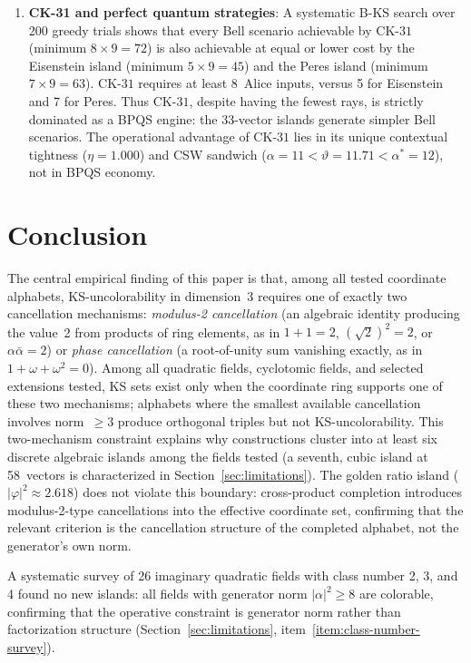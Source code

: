 \documentclass[12pt,a4paper]{article}
\newcommand{\CK}{\mathrm{CK}\text{-}31}
\begin{document}
\begin{enumerate}
    \item \textbf{CK-31 and perfect quantum strategies}: A systematic B-KS search over 200 greedy trials shows that every Bell scenario achievable by $\CK$ (minimum $8 \times 9 = 72$) is also achievable at equal or lower cost by the Eisenstein island (minimum $5 \times 9 = 45$) and the Peres island (minimum $7 \times 9 = 63$).  $\CK$ requires at least 8~Alice inputs, versus 5 for Eisenstein and 7 for Peres.  Thus $\CK$, despite having the fewest rays, is strictly dominated as a BPQS engine: the 33-vector islands generate simpler Bell scenarios. The operational advantage of $\CK$ lies in its unique contextual tightness ($\eta = 1.000$) and CSW sandwich ($\alpha = 11 < \vartheta = 11.71 < \alpha^* = 12$), not in BPQS economy.
\end{enumerate}

\section{Conclusion}\label{sec:conclusion}

The central empirical finding of this paper is that, among all tested coordinate alphabets, KS-uncolorability in dimension~3 requires one of exactly two cancellation mechanisms: \emph{modulus-2 cancellation} (an algebraic identity producing the value~2 from products of ring elements, as in $1+1=2$, $(\sqrt{2})^2=2$, or $\alpha\bar\alpha=2$) or \emph{phase cancellation} (a root-of-unity sum vanishing exactly, as in $1+\omega+\omega^2=0$).  Among all quadratic fields, cyclotomic fields, and selected extensions tested, KS sets exist only when the coordinate ring supports one of these two mechanisms; alphabets where the smallest available cancellation involves norm~$\geq 3$ produce orthogonal triples but not KS-uncolorability.  This two-mechanism constraint explains why constructions cluster into at least six discrete algebraic islands among the fields tested (a seventh, cubic island at 58~vectors is characterized in Section~\ref{sec:limitations}).  The golden ratio island ($|\varphi|^2 \approx 2.618$) does not violate this boundary: cross-product completion introduces modulus-2-type cancellations into the effective coordinate set, confirming that the relevant criterion is the cancellation structure of the completed alphabet, not the generator's own norm.

A systematic survey of 26 imaginary quadratic fields with class number 2, 3, and 4 found no new islands: all fields with generator norm $|\alpha|^2 \geq 8$ are colorable, confirming that the operative constraint is generator norm rather than factorization structure (Section~\ref{sec:limitations}, item~\ref{item:class-number-survey}).
\end{document}
